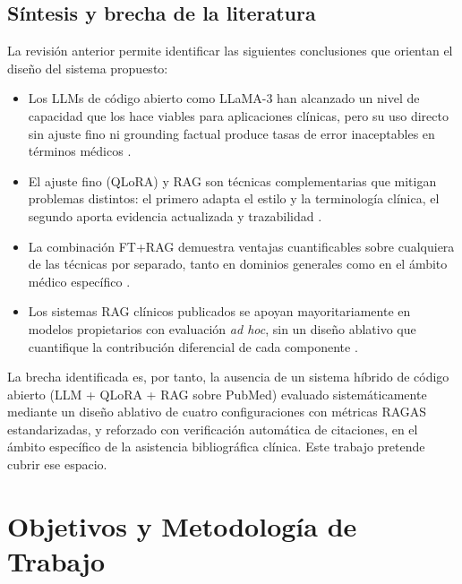 \documentclass[11pt,a4paper,spanish]{book}
\numberwithin{equation}{chapter}
\numberwithin{figure}{chapter}
\begin{document}
\section{Síntesis y brecha de la literatura}
\label{sec:c2_sintesis}

La revisión anterior permite identificar las siguientes conclusiones que orientan el diseño del sistema propuesto:

\begin{itemize}
  \item Los LLMs de código abierto como LLaMA-3 han alcanzado un nivel de capacidad que los hace viables para aplicaciones clínicas, pero su uso directo sin ajuste fino ni grounding factual produce tasas de error inaceptables en términos médicos \cite{pal_med-halt_2023}.

  \item El ajuste fino (QLoRA) y RAG son técnicas complementarias que mitigan problemas distintos: el primero adapta el estilo y la terminología clínica, el segundo aporta evidencia actualizada y trazabilidad \cite{ovadia2024finetuningretrievalcomparingknowledge}.

  \item La combinación FT+RAG demuestra ventajas cuantificables sobre cualquiera de las técnicas por separado, tanto en dominios generales \cite{balaguer2024ragvsfinetuningpipelines} como en el ámbito médico específico \cite{pingua_medical_FT_vs_RAG_2025, bioengineering13020225}.

  \item Los sistemas RAG clínicos publicados se apoyan mayoritariamente en modelos propietarios con evaluación \textit{ad hoc}, sin un diseño ablativo que cuantifique la contribución diferencial de cada componente \cite{amugongo_retrieval_2025}.
\end{itemize}

La brecha identificada es, por tanto, la ausencia de un sistema híbrido de código abierto (LLM + QLoRA + RAG sobre PubMed) evaluado sistemáticamente mediante un diseño ablativo de cuatro configuraciones con métricas RAGAS estandarizadas, y reforzado con verificación automática de citaciones, en el ámbito específico de la asistencia bibliográfica clínica. Este trabajo pretende cubrir ese espacio.

\chapter{Objetivos y Metodología de Trabajo}
\label{cap:objetivos}
\end{document}
